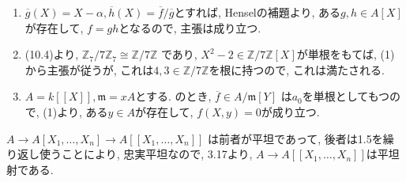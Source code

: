 \documentclass[dvipdfmx]{jsarticle}
\begin{document}
    \begin{problem}
        \begin{enumerate}
            \item $\overline{g}(X) = X-\alpha, \overline{h}(X) = \overline{f}/\overline{g}$とすれば,
            Henselの補題より, ある$g, h \in A[X]$が存在して, $f = gh$となるので,
            主張は成り立つ.
            \item (10.4)より,
            $\mathbb{Z}_7/7\mathbb{Z}_7 \cong \mathbb{Z}/7\mathbb{Z}$
            であり, $X^2-2 \in \mathbb{Z}/7\mathbb{Z}[X]$が単根をもてば, (1)から主張が従うが,
            これは$4,3 \in \mathbb{Z}/7\mathbb{Z}$を根に持つので, これは満たされる.
            \item $A = k[\![X]\!], \mathfrak{m} = xA$とする.
            のとき, $\overline{f} \in A/\mathfrak{m}[Y]$
            は$a_0$を単根としてもつので,
            (1)より, ある$y \in A$が存在して, $f(X, y) = 0$が成り立つ.
        \end{enumerate}
    \end{problem}

    \begin{problem}

    \end{problem}

    \begin{problem}
        $A \to A[X_1, \dots, X_n] \to A[\![X_1, \dots, X_n]\!]$
        は前者が平坦であって, 後者は1.5を繰り返し使うことにより, 忠実平坦なので,
        3.17より, $A \to A[\![X_1, \dots, X_n]\!]$は平坦射である.
    \end{problem}
\end{document}
